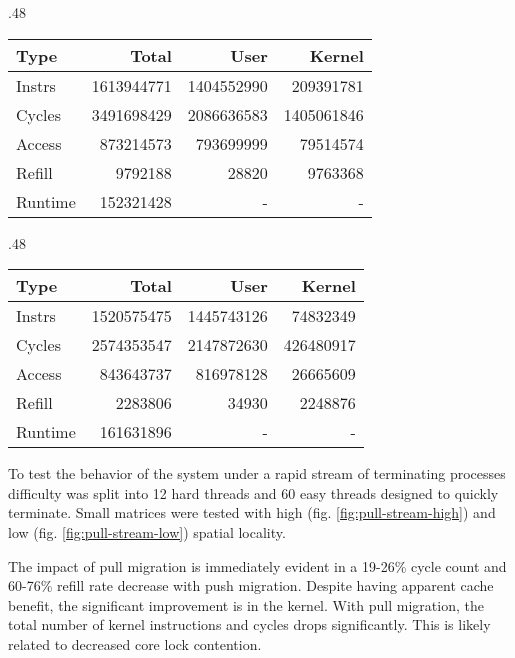 \documentclass[11pt]{article}
\begin{document}
\begin{figure*}
	\caption{threads with low spatial locality with a subset that quickly terminates}	
	\label{fig:pull-stream-low}				
	\begin{subtable}{.48\textwidth}
		\centering                 
		\begin{tabular}{l|rrr}       
			Type    & Total      & User       & Kernel     \\
			\hline
			Instrs  & 1613944771 & 1404552990 & 209391781  \\ 
			Cycles  & 3491698429 & 2086636583 & 1405061846 \\ 
			Access  & 873214573  & 793699999  & 79514574   \\ 
			Refill  & 9792188    & 28820      & 9763368    \\ 
			Runtime & 152321428  & -          & -          \\ 
			\hline
		\end{tabular}
		\caption{without pull migration}
	\end{subtable}
	\hfill
	\begin{subtable}{.48\textwidth}
		\centering                 
		\begin{tabular}{l|rrr}  
			Type    & Total      & User       & Kernel    \\
			\hline
			Instrs  & 1520575475 & 1445743126 & 74832349  \\ 
			Cycles  & 2574353547 & 2147872630 & 426480917 \\ 
			Access  & 843643737  & 816978128  & 26665609  \\ 
			Refill  & 2283806    & 34930      & 2248876   \\ 
			Runtime & 161631896  & -          & -         \\ 
			\hline
		\end{tabular}
		\caption{with pull migration}        
	\end{subtable}
\end{figure*}

To test the behavior of the system under a rapid stream of terminating processes difficulty was split into 12 hard threads and 60 easy threads designed to quickly terminate.  Small matrices were tested with high (fig. \ref{fig:pull-stream-high}) and low (fig. \ref{fig:pull-stream-low}) spatial locality.

The impact of pull migration is immediately evident in a 19-26\% cycle count and 60-76\% refill rate decrease with push migration.  Despite having apparent cache benefit, the significant improvement is in the kernel.  With pull migration, the total number of kernel instructions and cycles drops significantly.  This is likely related to decreased core lock contention.
\end{document}
